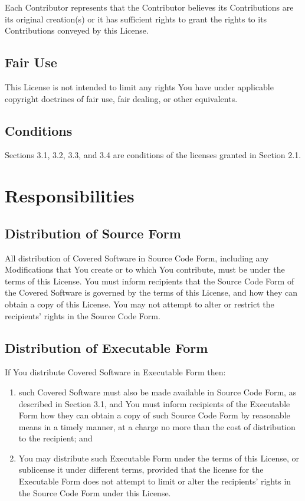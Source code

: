 \documentclass[a4paper, 12pt]{article}
\begin{document}
Each Contributor represents that the Contributor believes its Contributions are its original creation(s) or it has sufficient rights to grant the rights to its Contributions conveyed by this License.

\subsection{Fair Use}

This License is not intended to limit any rights You have under applicable copyright doctrines of fair use, fair dealing, or other equivalents.

\subsection{Conditions}

Sections 3.1, 3.2, 3.3, and 3.4 are conditions of the licenses granted in Section 2.1.

\section{Responsibilities}

\subsection{Distribution of Source Form}

All distribution of Covered Software in Source Code Form, including any Modifications that You create or to which You contribute, must be under the terms of this License. You must inform recipients that the Source Code Form of the Covered Software is governed by the terms of this License, and how they can obtain a copy of this License. You may not attempt to alter or restrict the recipients' rights in the Source Code Form.

\subsection{Distribution of Executable Form}

If You distribute Covered Software in Executable Form then:

\begin{enumerate}[label=(\alph*)]
\item such Covered Software must also be made available in Source Code Form, as described in Section 3.1, and You must inform recipients of the Executable Form how they can obtain a copy of such Source Code Form by reasonable means in a timely manner, at a charge no more than the cost of distribution to the recipient; and
\item You may distribute such Executable Form under the terms of this License, or sublicense it under different terms, provided that the license for the Executable Form does not attempt to limit or alter the recipients' rights in the Source Code Form under this License.
\end{enumerate}
\end{document}
